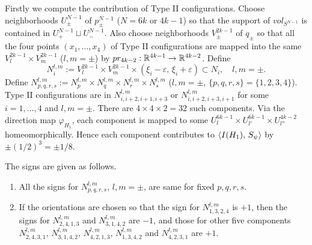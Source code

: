 Firstly we compute the contribution of Type II configurations.
Choose neighborhoods $U^{N-1}_{\pm}$ of $p^{N-1}_{\pm}$ ($N=6k$ or $4k-1$) so that the support of $vol_{S^{N-1}}$ is
contained in $U^{N-1}_+ \sqcup U^{N-1}_-$.
Also choose neighborhoods $V^{2k-1}_{\pm}$ of $q_{\pm}$ so that all the four points $(x_1 ,\dots ,x_4 )$ of Type II
configurations are mapped into the same $V^{2k-1}_l \times V^{2k-1}_m$ ($l,m=\pm$) by $pr_{4k-2}:\mathbb{R}^{4k-1}\to \mathbb{R}^{4k-2}$.
Define
\[
 N^{l,m}_i := V^{2k-1}_{l} \times V^{2k-1}_{m} \times (\xi_i -\varepsilon ,\, \xi_i +\varepsilon )
 \subset N_i ,\quad l,m =\pm .
\]
Define $N^{l,m}_{p,q,r,s}:=N^{l,m}_p \times N^{l,m}_q \times N^{l,m}_r \times N^{l,m}_s$ ($l,m=\pm$,
$\{ p,q,r,s \} =\{ 1,2,3,4\}$).
Type II configurations are in $N^{l,m}_{i,i+2,i+1,i+3}$ or $N^{l,m}_{i,i+2,i+3,i+1}$ for some $i=1,\dots ,4$ and
$l,m=\pm$.
There are $4\times 4\times 2=32$ such components.
Via the direction map $\varphi_{H_1}$, each component is mapped to some
$U^{6k-1}_l \times U^{6k-1}_{l'} \times U^{4k-2}_{l''}$ homeomorphically.
Hence each component contributes to $\langle {I(H_1 )},\, {S_{\psi}}\rangle$ by $\pm (1/2)^3 =\pm 1/8$.


The signs are given as follows.


\begin{lem}\label{lem_signs}
\begin{enumerate}
\item
 All the signs for $N^{l,m}_{p,q,r,s}$, $l,m=\pm$, are same for fixed $p,q,r,s$.
\item
 If the orientations are chosen so that the sign for $N^{l,m}_{1,3,2,4}$ is $+1$, then the signs for $N^{l,m}_{2,4,1,3}$
 and $N^{l,m}_{3,1,4,2}$ are $-1$, and those for other five components $N^{l,m}_{2,4,3,1}$, $N^{l,m}_{3,1,4,2}$,
 $N^{l,m}_{4,2,1,3}$, $N^{l,m}_{1,3,4,2}$ and $N^{l,m}_{4,2,3,1}$ are $+1$.
\end{enumerate}
\end{lem}


